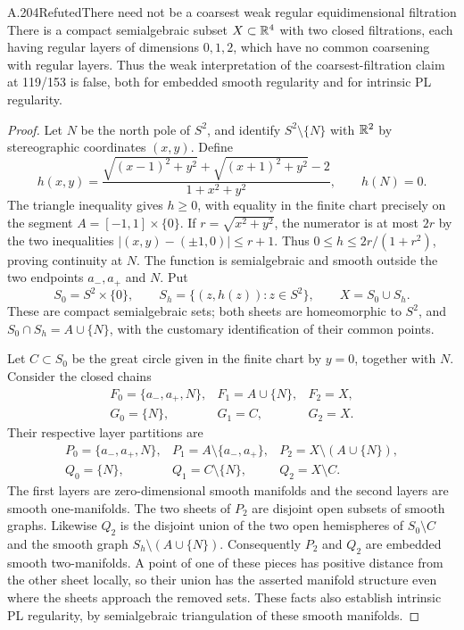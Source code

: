 \begin{saresult}{A.204}{Refuted}{There need not be a coarsest weak regular equidimensional filtration}
There is a compact semialgebraic subset $X\subset\mathbb R^4$ with two closed
filtrations, each having regular layers of dimensions $0,1,2$, which
have no common coarsening with regular layers. Thus the weak
interpretation of the coarsest-filtration claim at 119/153 is false,
both for embedded smooth regularity and for intrinsic PL regularity.
\end{saresult}
\begin{proof}
Let $N$ be the north pole of $S^2$, and identify $S^2\setminus\{N\}$
with $\mathbb R^2$ by stereographic coordinates $(x,y)$. Define
\[
 h(x,y)=
 \frac{\sqrt{(x-1)^2+y^2}+\sqrt{(x+1)^2+y^2}-2}
 {1+x^2+y^2},\qquad h(N)=0.
\]
The triangle inequality gives $h\ge0$, with equality in the finite
chart precisely on the segment $A=[-1,1]\times\{0\}$. If
$r=\sqrt{x^2+y^2}$, the numerator is at most $2r$ by the two
inequalities $|(x,y)-(\pm1,0)|\le r+1$. Thus
$0\le h\le2r/(1+r^2)$, proving continuity at $N$.
The function is semialgebraic and smooth outside the two endpoints
$a_-,a_+$ and $N$. Put
\[
 S_0=S^2\times\{0\},\qquad
 S_h=\{(z,h(z)):z\in S^2\},\qquad X=S_0\cup S_h.
\]
These are compact semialgebraic sets; both sheets are homeomorphic to
$S^2$, and $S_0\cap S_h=A\cup\{N\}$, with the customary
identification of their common points.

Let $C\subset S_0$ be the great circle given in the finite chart by
$y=0$, together with $N$. Consider the closed chains
\[
 \begin{array}{lll}
 F_0=\{a_-,a_+,N\},&F_1=A\cup\{N\},&F_2=X,\\
 G_0=\{N\},&G_1=C,&G_2=X.
 \end{array}
\]
Their respective layer partitions are
\[
 \begin{array}{lll}
 P_0=\{a_-,a_+,N\},&P_1=A\setminus\{a_-,a_+\},
 &P_2=X\setminus(A\cup\{N\}),\\
 Q_0=\{N\},&Q_1=C\setminus\{N\},&Q_2=X\setminus C.
 \end{array}
\]
The first layers are zero-dimensional smooth manifolds and the second
layers are smooth one-manifolds. The two sheets of $P_2$ are disjoint
open subsets of smooth graphs. Likewise $Q_2$ is the disjoint union
of the two open hemispheres of $S_0\setminus C$ and the smooth
graph $S_h\setminus(A\cup\{N\})$. Consequently $P_2$ and $Q_2$
are embedded smooth two-manifolds. A point of one of these pieces
has positive distance from the other sheet locally, so their union
has the asserted manifold structure even where the sheets approach
the removed sets. These facts also establish intrinsic PL regularity,
by semialgebraic triangulation of these smooth manifolds.


\end{proof}
